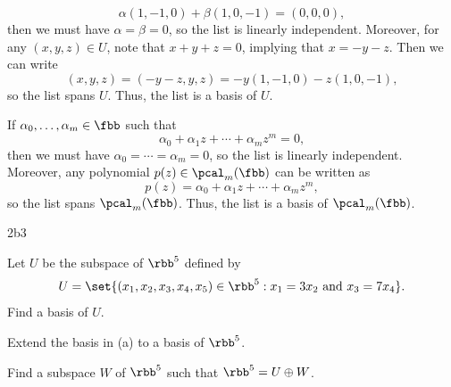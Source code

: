 \begin{solenum}
    \[
    	\alpha(1, -1, 0) + \beta(1, 0, -1) = (0, 0, 0),
    \]
    then we must have $\alpha = \beta = 0$, so the list is linearly independent.
	Moreover, for any $(x, y, z) \in U$, note that $x + y + z = 0$, implying that $x = -y - z$.
	Then we can write
    \[
    	(x, y, z) = (-y - z, y, z) = -y(1, -1, 0) - z(1, 0, -1),
    \]
    so the list spans $U$.
	Thus, the list is a basis of $U$.
    \item If $\alpha_0, \ldots, \alpha_m \in \fbb$ such that
    \[
    	\alpha_0 + \alpha_1 z + \cdots + \alpha_m z^m = 0,
    \]
    then we must have $\alpha_0 = \cdots = \alpha_m = 0$, so the list is linearly independent.
	Moreover, any polynomial $p(z) \in \pcal_m(\fbb)$ can be written as
    \[
    	p(z) = \alpha_0 + \alpha_1 z + \cdots + \alpha_m z^m,
    \]
    so the list spans $\pcal_m(\fbb)$.
	Thus, the list is a basis of $\pcal_m(\fbb)$.
\end{solenum}

\begin{exercise}{2b3}
    \begin{subexercises}
        \item Let $U$ be the subspace of $\rbb^5$ defined by
        \[
        	U = \set{(x_1, x_2, x_3, x_4, x_5) \in \rbb^5 : x_1 = 3x_2 \text{ and } x_3 = 7x_4}.
        \]
        Find a basis of $U$.
        \item Extend the basis in (a) to a basis of $\rbb^5$.
        \item Find a subspace $W$ of $\rbb^5$ such that $\rbb^5 = U \oplus W$.
    \end{subexercises}
\end{exercise}

